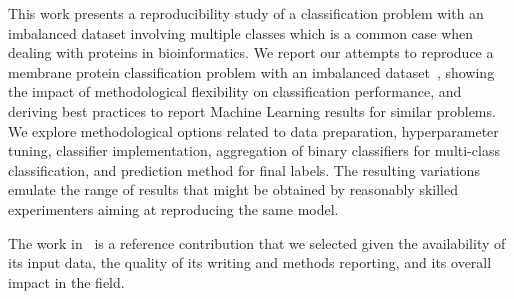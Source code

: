 This work presents a reproducibility study of a classification problem with an imbalanced dataset 
involving multiple classes which is a common case when dealing with proteins in bioinformatics. 
We report our attempts to reproduce a membrane protein classification problem with an imbalanced 
dataset~\cite{mishra_prediction_2014}, showing the impact of methodological
flexibility on classification performance, and deriving best practices to
report Machine Learning results for similar problems. We explore
methodological options related to data preparation, hyperparameter tuning,
classifier implementation, aggregation of binary classifiers for
multi-class classification, and prediction method for final labels. The
resulting variations emulate the range of results that might be obtained by
reasonably skilled experimenters aiming at reproducing the same model.

The work in~\cite{mishra_prediction_2014}
is a reference contribution that we selected given
the availability of its input data, the quality of its writing and methods
reporting, and its overall impact in the field. 